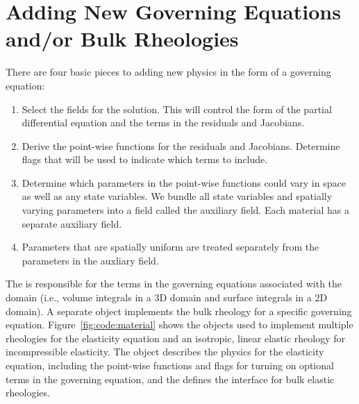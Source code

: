 \section{Adding New Governing Equations and/or Bulk Rheologies}

There are four basic pieces to adding new physics in the form of a
governing equation:
\begin{enumerate}
\item Select the fields for the solution. This will control the form
  of the partial differential equation and the terms in the residuals
  and Jacobians.
\item Derive the point-wise functions for the residuals and
  Jacobians. Determine flags that will be used to indicate which terms
  to include.
\item Determine which parameters in the point-wise functions could
  vary in space as well as any state variables. We bundle all state variables
  and spatially varying parameters into a field called the auxiliary
  field. Each material has a separate auxiliary field.
\item Parameters that are spatially uniform are treated separately
  from the parameters in the auxliary field.
\end{enumerate}

The  is responsible for the terms in the governing
equations associated with the domain (i.e., volume integrals in a 3D
domain and surface integrals in a 2D domain). A separate object
implements the bulk rheology for a specific governing
equation. Figure~\ref{fig:code:material} shows the objects used to
implement multiple rheologies for the elasticity equation and an
isotropic, linear elastic rheology for incompressible elasticity. The
 object describes the physics for the elasticity
equation, including the point-wise functions and flags for turning on
optional terms in the governing equation, and the
 defines the interface for bulk elastic
rheologies.

